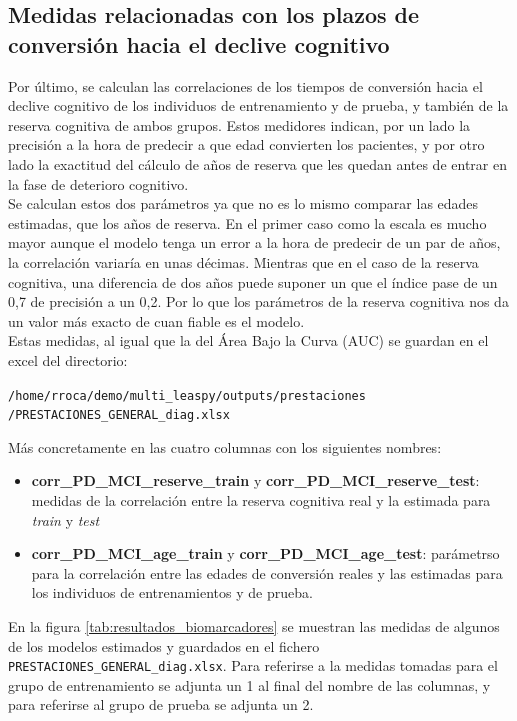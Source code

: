 \subsection{Medidas relacionadas con los plazos de conversión hacia el declive cognitivo}

Por último, se calculan las correlaciones de los tiempos de conversión hacia el declive cognitivo de los individuos de entrenamiento y de prueba, y también de la reserva cognitiva de ambos grupos. Estos medidores indican, por un lado la precisión a la hora de predecir a que edad convierten los pacientes, y por otro lado la exactitud del cálculo de años de reserva que les quedan antes de entrar en la fase de deterioro cognitivo. \\

Se calculan estos dos parámetros ya que no es lo mismo comparar las edades estimadas, que los años de reserva. En el primer caso como la escala es mucho mayor aunque el modelo tenga un error a la hora de predecir de un par de años, la correlación variaría en unas décimas. Mientras que en el caso de la reserva cognitiva, una diferencia de dos años puede suponer un que el índice pase de un 0,7 de precisión a un 0,2. Por lo que los parámetros de la reserva cognitiva nos da un valor más exacto de cuan fiable es el modelo.\\

Estas medidas, al igual que la del Área Bajo la Curva (AUC) se guardan en el excel del directorio:

\begin{center}
	\texttt{/home/rroca/demo/multi\_leaspy/outputs/prestaciones
		/PRESTACIONES\_GENERAL\_diag.xlsx}
\end{center}

Más concretamente en las cuatro columnas con los siguientes nombres:
\begin{itemize}
	\item \textbf{corr\_PD\_MCI\_reserve\_train} y \textbf{corr\_PD\_MCI\_reserve\_test}: medidas de la correlación entre la reserva cognitiva real y la estimada para \textit{train} y \textit{test}
	\item \textbf{corr\_PD\_MCI\_age\_train} y \textbf{corr\_PD\_MCI\_age\_test}: parámetrso para la correlación entre las edades de conversión reales y las estimadas para los individuos de entrenamientos y de prueba.
\end{itemize}

En la figura \ref{tab:resultados_biomarcadores} se muestran las medidas de algunos de los modelos estimados y guardados en el fichero \texttt{PRESTACIONES\_GENERAL\_diag.xlsx}. Para referirse a la medidas tomadas para el grupo de entrenamiento se adjunta un 1 al final del nombre de las columnas, y para referirse al grupo de prueba se adjunta un 2.


